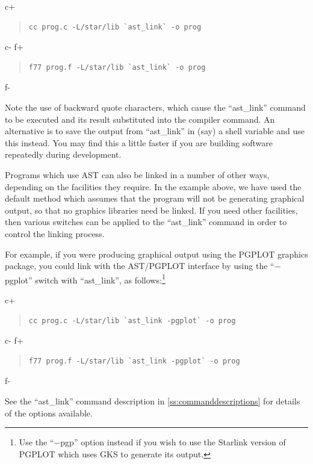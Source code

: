 \documentclass[twoside,11pt]{article}
\newcommand{\appref}[1]{Appendix~\ref{#1}}
\renewcommand{\appref}[1]{\ref{#1}}
\begin{document}
c+
\begin{quote}
\small
\begin{verbatim}
cc prog.c -L/star/lib `ast_link` -o prog
\end{verbatim}
\normalsize
\end{quote}
c-
f+
\begin{quote}
\small
\begin{verbatim}
f77 prog.f -L/star/lib `ast_link` -o prog
\end{verbatim}
\normalsize
\end{quote}
f-

Note the use of backward quote characters, which cause the
``ast\_link'' command to be executed and its result substituted into
the compiler command. An alternative is to save the output from
``ast\_link'' in (say) a shell variable and use this instead. You may
find this a little faster if you are building software repeatedly
during development.

Programs which use AST can also be linked in a number of other ways,
depending on the facilities they require. In the example above, we
have used the default method which assumes that the program will not
be generating graphical output, so that no graphics libraries need be
linked. If you need other facilities, then various switches can be
applied to the ``ast\_link'' command in order to control the linking
process.

For example, if you were producing graphical output using the PGPLOT
graphics package, you could link with the AST/PGPLOT interface by
using the ``$-$pgplot'' switch with ``ast\_link'', as
follows:\footnote{Use the ``$-$pgp'' option instead if you wish to use
the Starlink version of PGPLOT which uses GKS to generate its output.}

c+
\begin{quote}
\small
\begin{verbatim}
cc prog.c -L/star/lib `ast_link -pgplot` -o prog
\end{verbatim}
\normalsize
\end{quote}
c-
f+
\begin{quote}
\small
\begin{verbatim}
f77 prog.f -L/star/lib `ast_link -pgplot` -o prog
\end{verbatim}
\normalsize
\end{quote}
f-

See the ``ast\_link'' command description in
\appref{ss:commanddescriptions} for details of the options available.
\end{document}
